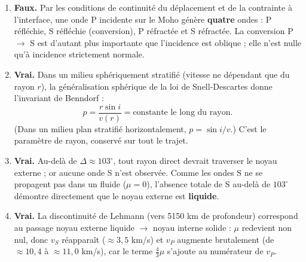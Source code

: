 \documentclass[11pt]{article}
\newcommand{\cle}[1]{{\popxbold\color{popdark}#1}}
\begin{document}
\begin{corrige}
\begin{enumerate}
    \item \textbf{Faux.} Par les conditions de continuité du déplacement et de la contrainte à l'interface, une onde P incidente sur le Moho génère \textbf{quatre} ondes : P réfléchie, S réfléchie (conversion), P réfractée et S réfractée. La conversion P $\to$ S est d'autant plus importante que l'incidence est oblique ; elle n'est nulle qu'à incidence strictement normale.
    \item \textbf{Vrai.} Dans un milieu sphériquement stratifié (vitesse ne dépendant que du rayon $r$), la généralisation sphérique de la loi de Snell-Descartes donne l'invariant de Benndorf :
    \[ p = \frac{r \sin i}{v(r)} = \text{constante le long du rayon}. \]
    (Dans un milieu plan stratifié horizontalement, $p = \sin i / v$.) C'est le \cle{paramètre de rayon}, conservé sur tout le trajet.
    \item \textbf{Vrai.} Au-delà de $\Delta \approx 103^\circ$, tout rayon direct devrait traverser le noyau externe ; or aucune onde S n'est observée. Comme les ondes S ne se propagent pas dans un fluide ($\mu = 0$), l'absence totale de S au-delà de $103^\circ$ démontre directement que le noyau externe est \textbf{liquide}.
    \item \textbf{Vrai.} La discontinuité de Lehmann (vers 5150 km de profondeur) correspond au passage noyau externe liquide $\to$ noyau interne solide : $\mu$ redevient non nul, donc $v_S$ réapparaît ($\approx 3,5$ km/s) et $v_P$ augmente brutalement (de $\approx 10,4$ à $\approx 11,0$ km/s), car le terme $\frac{4}{3}\mu$ s'ajoute au numérateur de $v_P$.
\end{enumerate}
\end{corrige}
\end{document}
